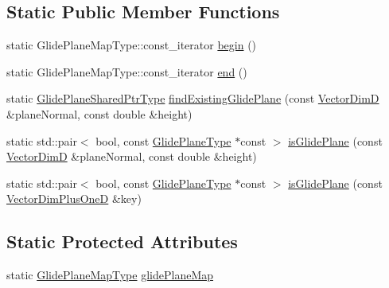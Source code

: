 \subsection*{Static Public Member Functions}
\begin{DoxyCompactItemize}
\item 
static Glide\+Plane\+Map\+Type\+::const\+\_\+iterator \hyperlink{structmodel_1_1_glide_plane_observer_a3346f4fa01c173c110e348a7f40d0ef8}{begin} ()
\item 
static Glide\+Plane\+Map\+Type\+::const\+\_\+iterator \hyperlink{structmodel_1_1_glide_plane_observer_a8333a82590816b9c7d83430e86b7746b}{end} ()
\item 
static \hyperlink{structmodel_1_1_glide_plane_observer_a1db5edc59e298b9504e29de2081973c4}{Glide\+Plane\+Shared\+Ptr\+Type} \hyperlink{structmodel_1_1_glide_plane_observer_a374732855fa19bce8b31f97a4322b57b}{find\+Existing\+Glide\+Plane} (const \hyperlink{structmodel_1_1_glide_plane_observer_a3ac9c571b18b2bf2043a7e74cb73fc80}{Vector\+Dim\+D} \&plane\+Normal, const double \&height)
\item 
static std\+::pair$<$ bool, const \hyperlink{structmodel_1_1_glide_plane_observer_afb0ef99e698d5e00236daf826f0ccfb0}{Glide\+Plane\+Type} $\ast$const  $>$ \hyperlink{structmodel_1_1_glide_plane_observer_a6ed81d38e093053d6fb0dafe1211ab72}{is\+Glide\+Plane} (const \hyperlink{structmodel_1_1_glide_plane_observer_a3ac9c571b18b2bf2043a7e74cb73fc80}{Vector\+Dim\+D} \&plane\+Normal, const double \&height)
\item 
static std\+::pair$<$ bool, const \hyperlink{structmodel_1_1_glide_plane_observer_afb0ef99e698d5e00236daf826f0ccfb0}{Glide\+Plane\+Type} $\ast$const  $>$ \hyperlink{structmodel_1_1_glide_plane_observer_a34f72c439a2f1311555cf5f7da3cddfd}{is\+Glide\+Plane} (const \hyperlink{structmodel_1_1_glide_plane_observer_af9001f8c11da2a2812813d2a53c14c46}{Vector\+Dim\+Plus\+One\+D} \&key)
\end{DoxyCompactItemize}
\subsection*{Static Protected Attributes}
\begin{DoxyCompactItemize}
\item 
static \hyperlink{structmodel_1_1_glide_plane_observer_ad84427bd16fe79b950b870adfbb89dbe}{Glide\+Plane\+Map\+Type} \hyperlink{structmodel_1_1_glide_plane_observer_a7ed557e3e1e5c77b9804d20b868b48e0}{glide\+Plane\+Map}
\end{DoxyCompactItemize}
